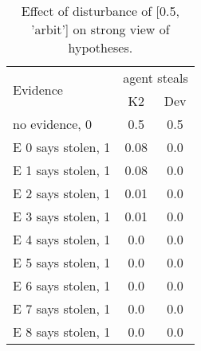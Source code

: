 \begin{table}\begin{tabular}{l|cc}\toprule\multirow{2}{*}{Evidence} & \multicolumn{2}{c}{agent steals}\\& {K2} & {Dev}\\\midrule
no evidence, 0 & 0.5&0.5\\E 0 says stolen, 1 & \cellcolor{Bittersweet}0.08&\cellcolor{Bittersweet}0.0\\E 1 says stolen, 1 & \cellcolor{Bittersweet}0.08&\cellcolor{Bittersweet}0.0\\E 2 says stolen, 1 & 0.01&0.0\\E 3 says stolen, 1 & 0.01&0.0\\E 4 says stolen, 1 & 0.0&0.0\\E 5 says stolen, 1 & 0.0&0.0\\E 6 says stolen, 1 & 0.0&0.0\\E 7 says stolen, 1 & 0.0&0.0\\E 8 says stolen, 1 & 0.0&0.0\\\bottomrule\end{tabular}\caption{Effect of disturbance of [0.5, 'arbit'] on strong view of hypotheses.}\end{table}